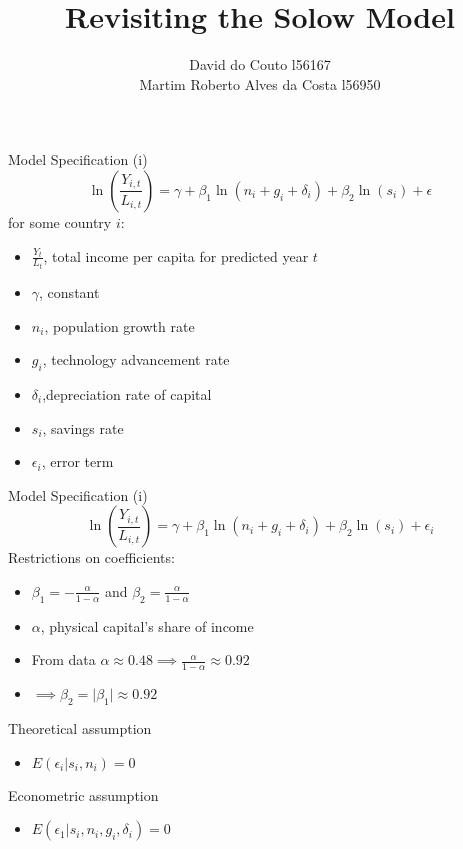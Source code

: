 \documentclass{beamer}
\title{Revisiting the Solow Model}
\author{David do Couto l56167 \\ Martim Roberto Alves da Costa l56950}
\institute{ISEG \\ ULisboa}
\date{}
\begin{document}
\begin{frame}[plain]
    \maketitle
\end{frame}


\begin{frame}{Model Specification (i)}
\begin{equation*}
 \ln \left ( \frac{Y_{i,t}}{L_{i,t}} \right ) = \gamma + \beta_1 \ln(n_i + g_i + \delta_i) + \beta_2 \ln(s_i) + \epsilon
\end{equation*}
for some country $i$:
\begin{itemize}
	\item $\frac{Y_t}{L_t}$, total income per capita for predicted year $t$
	\item $\gamma$, constant
	\item $n_i$, population growth rate
	\item $g_i$, technology advancement rate
	\item $\delta_i$,depreciation rate of capital
	\item $s_i$, savings rate
	\item $\epsilon_i$, error term
\end{itemize}
\end{frame}

\begin{frame}{Model Specification (i)}
	\begin{equation*}
		\ln \left ( \frac{Y_{i,t}}{L_{i,t}} \right ) = \gamma + \beta_1 \ln(n_i + g_i + \delta_i) + \beta_2 \ln(s_i) + \epsilon_i
	\end{equation*}
	Restrictions on coefficients:
	\begin{itemize}
		\item $\beta_1 = - \frac{\alpha}{1-\alpha}$ and $\beta_2 = \frac{\alpha}{1-\alpha}$
		\item $\alpha$, physical capital's share of income
		\item From data $\alpha \approx 0.48 \implies \frac{\alpha}{1-\alpha} \approx 0.92$
		\item $\implies \beta_2 = \lvert \beta_1 \rvert \approx 0.92$
	\end{itemize}
Theoretical assumption
\begin{itemize}
	\item $E(\epsilon_i | s_i , n_i) = 0$
\end{itemize}
Econometric assumption
\begin{itemize}
	\item $E(\epsilon_1 | s_i, n_i, g_i, \delta_i) = 0$
\end{itemize}
\end{frame}
\end{document}
